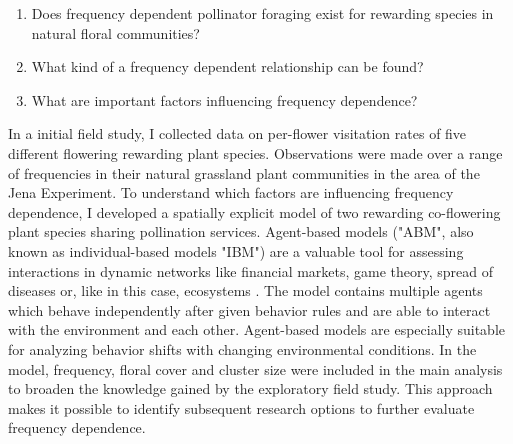 \begin{enumerate}
	\item Does frequency dependent pollinator foraging exist for rewarding species in natural floral communities?
	\item	What kind of a frequency dependent relationship can be found?
	\item	What are important factors influencing frequency dependence?
\end{enumerate}

In a initial field study, I collected data on per-flower visitation rates of five different flowering rewarding plant species. Observations were made over a range of frequencies in their natural grassland plant communities in the area of the Jena Experiment. To understand which factors are influencing frequency dependence, I developed a spatially explicit model of two rewarding co-flowering plant species sharing pollination services. Agent-based models ("ABM", also known as individual-based models "IBM") are a valuable tool for assessing interactions in dynamic networks like financial markets, game theory, spread of diseases or, like in this case, ecosystems \citep{deangelis2005individual}. The model contains multiple agents which behave independently after given behavior rules and are able to interact with the environment and each other. Agent-based models are especially suitable for analyzing behavior shifts with changing environmental conditions. In the model, frequency, floral cover and cluster size were included in the main analysis to broaden the knowledge gained by the exploratory field study. This approach makes it possible to identify subsequent research options to further evaluate frequency dependence.



%
%
%
%
%



